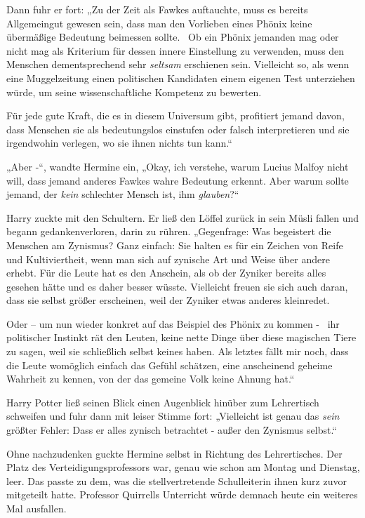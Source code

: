 {Dann fuhr er fort: „Zu der Zeit als Fawkes auftauchte, muss es bereits Allgemeingut gewesen sein, dass man den Vorlieben eines Phönix keine übermäßige Bedeutung beimessen sollte. ~Ob ein Phönix jemanden mag oder nicht mag als Kriterium für dessen innere Einstellung zu verwenden, muss den Menschen dementsprechend sehr \emph{seltsam} erschienen sein. Vielleicht so, als wenn eine Muggelzeitung einen politischen Kandidaten einem eigenen Test unterziehen würde, um seine wissenschaftliche Kompetenz zu bewerten.

Für jede gute Kraft, die es in diesem Universum gibt, profitiert jemand davon, dass Menschen sie als bedeutungslos einstufen oder falsch interpretieren und sie irgendwohin verlegen, wo sie ihnen nichts tun kann.“

„Aber -“, wandte Hermine ein, „Okay, ich verstehe, warum Lucius Malfoy nicht will, dass jemand anderes Fawkes wahre Bedeutung erkennt. Aber warum sollte jemand, der \emph{kein} schlechter Mensch ist, ihm \emph{glauben}?“

Harry zuckte mit den Schultern. Er ließ den Löffel zurück in sein Müsli fallen und begann gedankenverloren, darin zu rühren. „Gegenfrage: Was begeistert die Menschen am Zynismus? Ganz einfach: Sie halten es für ein Zeichen von Reife und Kultiviertheit, wenn man sich auf zynische Art und Weise über andere erhebt. Für die Leute hat es den Anschein, als ob der Zyniker bereits alles gesehen hätte und es daher besser wüsste. Vielleicht freuen sie sich auch daran, dass sie selbst größer erscheinen, weil der Zyniker etwas anderes kleinredet.

Oder -- um nun wieder konkret auf das Beispiel des Phönix zu kommen - ~ihr politischer Instinkt rät den Leuten, keine nette Dinge über diese magischen Tiere zu sagen, weil sie schließlich selbst keines haben. Als letztes fällt mir noch, dass die Leute womöglich einfach das Gefühl schätzen, eine anscheinend geheime Wahrheit zu kennen, von der das gemeine Volk keine Ahnung hat.“

Harry Potter ließ seinen Blick einen Augenblick hinüber zum Lehrertisch schweifen und fuhr dann mit leiser Stimme fort: „Vielleicht ist genau das \emph{sein} größter Fehler: Dass er alles zynisch betrachtet - außer den Zynismus selbst.“

Ohne nachzudenken guckte Hermine selbst in Richtung des Lehrertisches. Der Platz des Verteidigungsprofessors war, genau wie schon am Montag und Dienstag, leer. Das passte zu dem, was die stellvertretende Schulleiterin ihnen kurz zuvor mitgeteilt hatte. Professor Quirrells Unterricht würde demnach heute ein weiteres Mal ausfallen.

}
